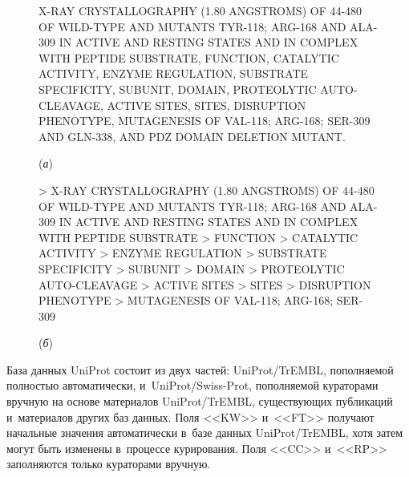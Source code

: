 \begin{multicols}{2}
  \begin{figure*}[b] %
  \begin{center}
  
  {\small
  \begin{boxedverbatim}
X-RAY CRYSTALLOGRAPHY (1.80 ANGSTROMS) OF 44-480 OF WILD-TYPE AND MUTANTS TYR-118;
ARG-168 AND ALA-309 IN ACTIVE AND RESTING STATES AND IN COMPLEX WITH PEPTIDE SUBSTRATE, 
FUNCTION, CATALYTIC ACTIVITY, ENZYME REGULATION, SUBSTRATE SPECIFICITY, SUBUNIT, DOMAIN, 
PROTEOLYTIC AUTO-CLEAVAGE, ACTIVE SITES, SITES, DISRUPTION PHENOTYPE, MUTAGENESIS
OF VAL-118; ARG-168; SER-309 AND GLN-338, AND PDZ DOMAIN DELETION MUTANT.
\end{boxedverbatim}

}
\begin{center}
{\small (\textit{а})}
\end{center}

{\small
\begin{boxedverbatim}
> X-RAY CRYSTALLOGRAPHY (1.80 ANGSTROMS) OF 44-480 OF WILD-TYPE AND MUTANTS TYR-118;
ARG-168 AND ALA-309 IN ACTIVE AND RESTING STATES AND IN COMPLEX WITH PEPTIDE SUBSTRATE
> FUNCTION
> CATALYTIC ACTIVITY
> ENZYME REGULATION
> SUBSTRATE SPECIFICITY
> SUBUNIT
> DOMAIN
> PROTEOLYTIC AUTO-CLEAVAGE
> ACTIVE SITES
> SITES
> DISRUPTION PHENOTYPE
  > MUTAGENESIS OF VAL-118; ARG-168; SER-309
\end{boxedverbatim}

}

\begin{center}
{\small (\textit{б})}
\end{center}
  \end{center}
  
  \vspace*{-14pt}
  
  \begin{center}
  \end{center}
  \vspace*{-12pt}
  \end{figure*}
  
  
  
  База данных UniProt состоит из двух час\-тей: UniProt/TrEMBL, пополняемой 
полностью автоматически, и~UniProt/Swiss-Prot, по\-пол\-ня\-емой кураторами 
вручную на основе материалов UniProt/TrEMBL, существующих публикаций 
и~материалов других баз данных. Поля <<KW>> и~<<FT>> получают 
начальные значения автоматически в~базе данных UniProt/TrEMBL, хотя затем 
могут быть изменены в~процессе курирования. Поля <<CC>> и~<<RP>> 
заполняются только кураторами вручную.
  

\end{multicols}
